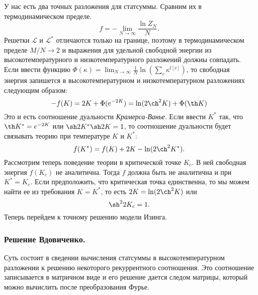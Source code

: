 \documentclass[a4paper,12pt]{article} \usepackage[utf8x]{inputenc} \usepackage[russian]{babel}
\theoremstyle{definition} \newtheorem{corollary}{Corollary}[theorem] \theoremstyle{definition}
\begin{document}
У нас есть два точных разложения для статсуммы. Сравним их в термодинамическом пределе.
\begin{equation}
  \label{eq:109} f=-\lim_{N\to \infty}\frac{\ln Z_N}{N}.
\end{equation} Решетки $\mathcal{L}$ и $\mathcal{L}^*$ отличаются только на границе, поэтому в
термодинамическом пределе $M/N\to 2$ и выражения для удельной свободной энергии из
высокотемпературного и низкотемпературного разложений должны совпадать. Если ввести функцию
$\Phi(\kappa)=\lim_{N\to \infty}\frac{1}{N} \ln \left(\sum_c \kappa^{l[c]}\right)$, то свободная
энергия запишется в высокотемпературном и низкотемпературном разложениях следующим образом:
\begin{equation}
  \label{eq:110} -f(K)=2K+\Phi(e^{-2K})=\ln(2\ch^2 K)+\Phi(\th K)
\end{equation} Это и есть соотношение дуальности {\it Крамерса-Ванье}. Если ввести $K^*$ так, что
$\th K^*=e^{-2K}$ или $\sh 2K^* \sh 2K=1$, то соотношение дуальности будет связывать теорию при
температуре $K$ и $K^*$:
\begin{equation}
  \label{eq:111} f(K^*)=f(K)+2K-\ln(2\ch^2 K^*).
\end{equation} Рассмотрим теперь поведение теории в критической точке $K_c$. В ней свободная энергия
$f(K_c)$ не аналитична. Тогда $f$ должна быть не аналитична и при $K^*=K_c$. Если предположить, что
критическая точка единственна, то мы можем найти ее из требования $K=K^*$, то есть $2K=\ln(2\ch^2
K)$ или
\begin{equation}
  \label{eq:112} \sh^2 2K_c=1.
\end{equation} Теперь перейдем к точному решению модели Изинга.

\subsubsection{Решение Вдовиченко.}
\label{sec:ising-solution} Суть состоит в сведении вычисления статсуммы в высокотемпературном
разложении к решению некоторого рекуррентного соотношения. Это соотношение записывается в матричном
виде и его решение дается следом матрицы, который можно вычислить после преобразования Фурье.
\end{document}
